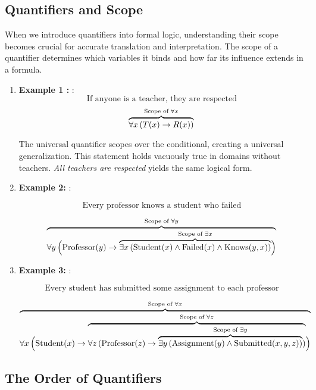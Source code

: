 \documentclass[12pt,a4paper,openany]{article}
\begin{document}
\subsection{Quantifiers and Scope}\label{quantifiers-and-scope}

When we introduce quantifiers into formal logic, understanding their
scope becomes crucial for accurate translation and interpretation. The
scope of a quantifier determines which variables it binds and how far
its influence extends in a formula.

\begin{enumerate}
\def\labelenumi{\arabic{enumi}.}
\item
  \textbf{Example 1 :} : \[\text{If anyone is a teacher, they are respected}\] \[
   \color{black}{\overbrace{\color{black}\forall x \, (T(x) \to R(x))}^{\color{black}\text{Scope of } \forall x}}
   \]

  The universal quantifier scopes over the conditional, creating a
  universal generalization. This statement holds vacuously true in
  domains without teachers. \emph{All teachers are respected} yields the
  same logical form.
\item
  \textbf{Example 2:} :

  \[\text{Every professor knows a student who failed}\]

  \[
   {\color{black}\overbrace{\color{black}\forall y \, \Big( \text{Professor}(y) \rightarrow
   {\color{black}\overbrace{\color{black}\exists x \, (\text{Student}(x) \wedge \text{Failed}(x) \wedge \text{Knows}(y,x))}^{\color{black}\text{Scope of } \exists x}} \Big)}^{\color{black}\text{Scope of } \forall y}}
   \]
\item
  \textbf{Example 3:} :

  \[\text{Every student has submitted some assignment to each professor}\]

  \[
   {\color{black}\overbrace{\color{black}\forall x \, \Big( \text{Student}(x) \rightarrow
   {\color{black}\overbrace{\color{black}\forall z \, (\text{Professor}(z) \rightarrow 
   {\color{black}\overbrace{\color{black}\exists y \, (\text{Assignment}(y) \wedge \text{Submitted}(x,y,z))}^{\color{black}\text{Scope of } \exists y}})}^{\color{black}\text{Scope of } \forall z}} \Big)}^{\color{black}\text{Scope of } \forall x}}
   \]
\end{enumerate}

\subsection{The Order of
Quantifiers}\label{the-order-of-quantifiers}
\end{document}
